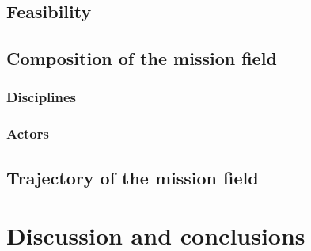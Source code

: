 \documentclass[11pt]{article}
\begin{document}
\subsection{Feasibility}
\subsection{Composition of the mission field}
\subsubsection{Disciplines}
\subsubsection{Actors}
\subsection{Trajectory of the mission field}
\section{Discussion and conclusions}




%
\end{document}
